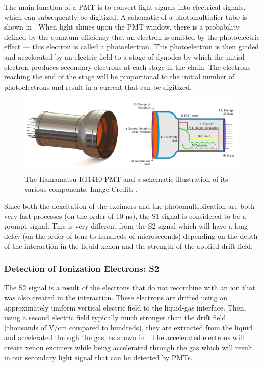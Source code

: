 The main function of a PMT is to convert light signals into electrical signals, which can subsequently be digitized.  A schematic of a photomultiplier tube is shown in .  When light shines upon the PMT window, there is a probability defined by the quantum efficiency that an electron is emitted by the photoelectric effect --- this electron is called a photoelectron.  This photoelectron is then guided and accelerated by an electric field to a stage of dynodes by which the initial electron produces secondary electrons at each stage in the chain.  The electrons reaching the end of the stage will be proportional to the initial number of photoelectrons and result in a current that can be digitized.  

 \begin{figure}[t]
	\centering
	\includegraphics[width=0.99\textwidth]{tpc_pmt}
	\caption{The Hamamatsu R11410 PMT and a schematic illustration of its various components.  Image Credit: .}
	\label{fig:tpc_pmt}
\end{figure}

Since both the dexcitation of the excimers and the photomultiplication are both very fast processes (on the order of 10 ns), the S1 signal is considered to be a prompt signal.  This is very different from the S2 signal which will have a long delay (on the order of tens to hundreds of microseconds) depending on the depth of the interaction in the liquid xenon and the strength of the applied drift field.


\subsubsection{Detection of Ionization Electrons: S2}
\label{sec:tpc_s2_sig}

The S2 signal is a result of the electrons that do not recombine with an ion that was also created in the interaction.  These electrons are drifted using an approximately uniform vertical electric field to the liquid-gas interface.  Then, using a second electric field typically much stronger than the drift field (thousands of V/cm compared to hundreds), they are extracted from the liquid and accelerated through the gas, as shown in .  The accelerated electrons will create xenon excimers while being accelerated through the gas which will result in our secondary light signal that can be detected by PMTs.

